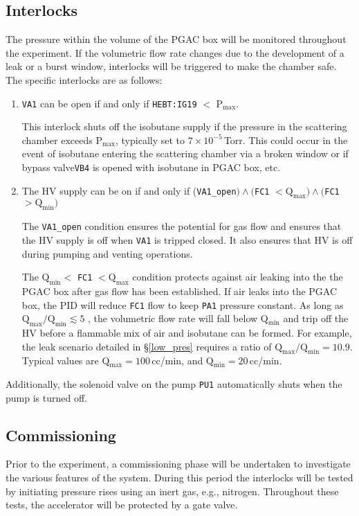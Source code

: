 \subsection{Interlocks}
\label{interlocks}
The pressure within the volume of the PGAC box will be monitored throughout the experiment. If
the volumetric flow rate changes due to the development of a leak or a burst window, interlocks will be
triggered to make the chamber safe. The specific interlocks are as follows:
\begin{enumerate}
\item \texttt{VA1} can be open if and only if \texttt{HEBT:IG19} $<$ $\textrm{P}_\textrm{max}$.

This interlock shuts off the isobutane supply if the pressure in the scattering chamber exceeds $\textrm{P}_\textrm{max}$, typically set to $7\times10^{-5}$\,Torr.  This could occur in the event of isobutane entering the  scattering chamber via a broken window or if  bypass valve\texttt{VB4}   is opened with isobutane in PGAC box, etc.
\item The HV supply can be on if and only if 
(\texttt{VA1\_open}$) \land ($\texttt{FC1} $<\textrm{Q}_\textrm{max}) \land ($\texttt{FC1} $> \textrm{Q}_\textrm{min})$

The \texttt{VA1\_open} condition ensures the potential for gas flow and ensures that the  HV supply is off when \texttt{VA1} is tripped closed. %
 It also
ensures that HV is off during pumping and venting operations.

The $\textrm{Q}_\textrm{min} < $ \texttt{FC1} $ < \textrm{Q}_\textrm{max}$ condition protects against air leaking into the the PGAC box after gas flow has
been established.
If air leaks into the PGAC box, the PID will reduce \texttt{FC1} flow to keep \texttt{PA1} pressure
constant.
As long as $\textrm{Q}_\textrm{max}/\textrm{Q}_\textrm{min} \lesssim 5$ , the volumetric flow rate will fall below Q$_\textrm{min}$ and trip off the HV before a
flammable mix of air and isobutane can be formed.  For example, the leak scenario detailed in \S\ref{low_pres} requires a ratio of $\textrm{Q}_\textrm{max}/\textrm{Q}_\textrm{min} =10.9$.  Typical values are Q$_\textrm{max}=100$\,cc/min, and  Q$_\textrm{min}=20$\,cc/min.
\end{enumerate}

\noindent Additionally, the solenoid valve on the pump \texttt{PU1} automatically shuts when the pump is turned off.
\subsection{Commissioning}
Prior to the experiment, a commissioning phase will be undertaken to investigate the various
features of the system. During this period the interlocks will be tested by initiating pressure rises
using an inert gas, e.g., nitrogen. %
Throughout these tests, the accelerator will
be protected by a gate valve.
